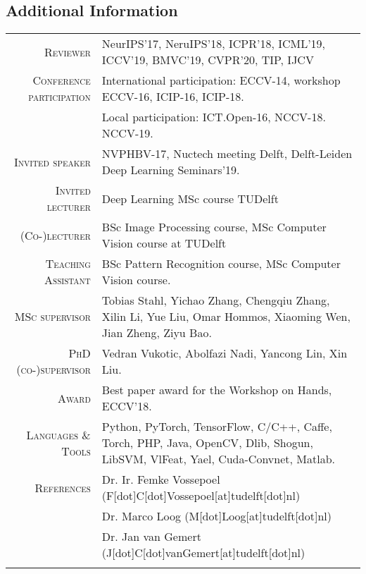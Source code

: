 \documentclass[a4paper, oneside, final]{scrartcl}
\begin{document}
\begin{center}
		\section{Additional Information}
		\begin{tabular}{r@{\hskip 0.3in}p{11.3cm}}
            \textsc{Reviewer}                   & NeurIPS'17, NeruIPS'18, ICPR'18, ICML'19, ICCV'19, BMVC'19, CVPR'20, TIP, IJCV\\
            \textsc{Conference participation}   & International participation: ECCV-14, workshop ECCV-16, ICIP-16, ICIP-18.\\ 
                                                & Local participation: ICT.Open-16, NCCV-18. NCCV-19.\\
            \textsc{Invited speaker}            & NVPHBV-17, Nuctech meeting Delft, Delft-Leiden Deep Learning Seminars'19.\\
            \textsc{Invited lecturer}           & Deep Learning MSc course TUDelft\\
			\textsc{(Co-)lecturer}		        & BSc Image Processing course, MSc Computer Vision course at TUDelft\\
            \textsc{Teaching Assistant}         & BSc Pattern Recognition course, MSc Computer Vision course.\\ 
			\textsc{MSc supervisor}             & Tobias Stahl, Yichao Zhang, Chengqiu Zhang, Xilin Li, Yue Liu, Omar Hommos, Xiaoming Wen, Jian Zheng, Ziyu Bao.\\
			\textsc{PhD (co-)supervisor}        & Vedran Vukotic, Abolfazi Nadi, Yancong Lin, Xin Liu.\\[5px] 
            \textsc{Award}                      & Best paper award for the Workshop on Hands, ECCV'18.\\  
			\textsc{Languages \& Tools}         & Python, PyTorch, TensorFlow, C\slash C++, Caffe, Torch, PHP, Java, OpenCV, Dlib, Shogun, LibSVM, VlFeat, Yael, Cuda-Convnet, Matlab.\\

			\textsc{References} & Dr. Ir. Femke Vossepoel (F[dot]C[dot]Vossepoel[at]tudelft[dot]nl)\\
                                & Dr. Marco Loog (M[dot]Loog[at]tudelft[dot]nl)\\
                                & Dr. Jan van Gemert (J[dot]C[dot]vanGemert[at]tudelft[dot]nl)\\
			\multicolumn{2}{c}{}\\
		\end{tabular}
	\end{center}
\end{document}
